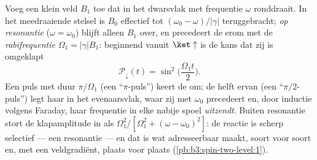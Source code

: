 \begin{proposition}\label{prop:b3:spin-two-level:rabi}
Voeg een klein veld $B_1$ toe dat in het dwarsvlak met frequentie
$\omega$ ronddraait. In het meedraaiende stelsel is $B_0$ effectief tot
$(\omega_0 - \omega)/|\gamma|$ teruggebracht; \emph{op resonantie}
($\omega = \omega_0$) blijft alleen $B_1$ over, en precedeert de 
erom met de \emph{rabifrequentie} $\Omega_1 =
|\gamma|B_1$: beginnend
vanuit $\ket\uparrow$ is de kans dat zij is omgeklapt
\[
\mathcal P_\downarrow(t) = \sin^2\Big(\frac{\Omega_1t}{2}\Big) .
\]
Een puls met duur $\pi/\Omega_1$ (een ``$\pi$-puls'') keert de  om;
de helft ervan (een ``$\pi/2$-puls'') legt haar in het evenaarsvlak, waar
zij met $\omega_0$ precedeert en, door inductie volgens Faraday, haar
frequentie in elke nabije spoel \emph{uitzendt}. Buiten resonantie stort
de klapamplitude in als $\Omega_1^2/[\Omega_1^2 +
(\omega - \omega_0)^2]$: de reactie is scherp selectief --- een resonantie --- en
dat is wat  adresseerbaar maakt, soort voor soort en, met een
veldgradiënt, plaats voor plaats
(\cref{pb:b3:spin-two-level:1}).
\end{proposition}
\admitted

